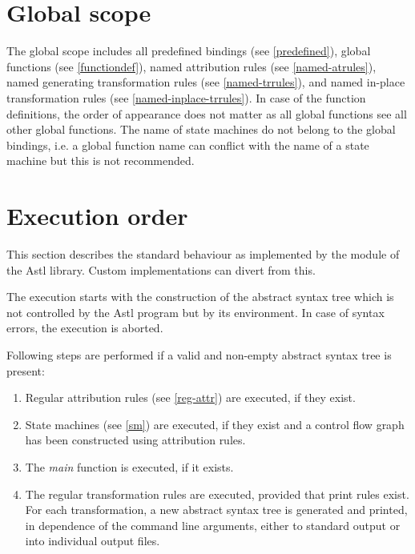 \section{Global scope}

The global scope includes all predefined bindings (see \ref{predefined}),
global functions (see \ref{functiondef}), named attribution rules
(see \ref{named-atrules}), named generating transformation rules (see
\ref{named-trrules}), and named in-place transformation rules
(see \ref{named-inplace-trrules}). In case of the function definitions,
the order of appearance does not matter as all global functions see all
other global functions.  The name of state machines do not belong to
the global bindings, i.e. a global function name can conflict with the
name of a state machine but this is not recommended.

\section{Execution order}\label{xorder}

This section describes the standard behaviour as implemented by
the  module of the Astl library. Custom implementations
can divert from this.

The execution starts with the construction of the abstract syntax tree
which is not controlled by the Astl program but by its environment.
In case of syntax errors, the execution is aborted.

Following steps are performed if a valid and non-empty
abstract syntax tree is present:

\begin{enumerate}
   \item Regular attribution rules (see \ref{reg-attr}) are executed,
      if they exist.
   \item State machines (see \ref{sm}) are executed, if they exist
      and a control flow graph has been constructed using attribution rules.
   \item The \textit{main} function is executed, if it exists.
   \item The regular transformation rules are executed, provided
      that print rules exist.
      For each transformation, a new abstract syntax tree is generated
      and printed, in dependence of the command line arguments, either
      to standard output or into individual output files.
\end{enumerate}

\endinput
